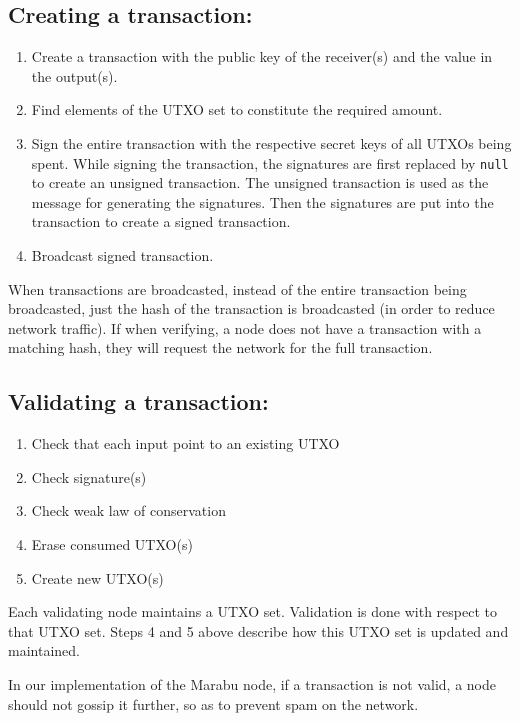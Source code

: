 \subsection{Creating a transaction:}
\begin{enumerate}
    \item Create a transaction with the public key of the receiver(s) and the value in the output(s).
    \item Find elements of the UTXO set to constitute the required amount.
    \item Sign the entire transaction with the respective secret keys of all UTXOs being spent. While signing the transaction, the signatures are first replaced by \verb|null| to create an unsigned transaction. The unsigned transaction is used as the message for generating the signatures. Then the signatures are put into the transaction to create a signed transaction.
    \item Broadcast signed transaction.
\end{enumerate}

When transactions are broadcasted, instead of the entire transaction being broadcasted, just the hash of the transaction is broadcasted (in order to reduce network traffic). If when verifying, a node does not have a transaction with a matching hash, they will request the network for the full transaction.

\subsection{Validating a transaction:}
\begin{enumerate}
    \item Check that each input point to an existing UTXO
    \item Check signature(s)
    \item Check weak law of conservation
    \item Erase consumed UTXO(s)
    \item Create new UTXO(s)
\end{enumerate}

Each validating node maintains a UTXO set. Validation is done with respect to that UTXO set. Steps 4 and 5 above describe how this UTXO set is updated and maintained.

In our implementation of the Marabu node, if a transaction is not valid, a node should not gossip it further, so as to prevent spam on the network.
